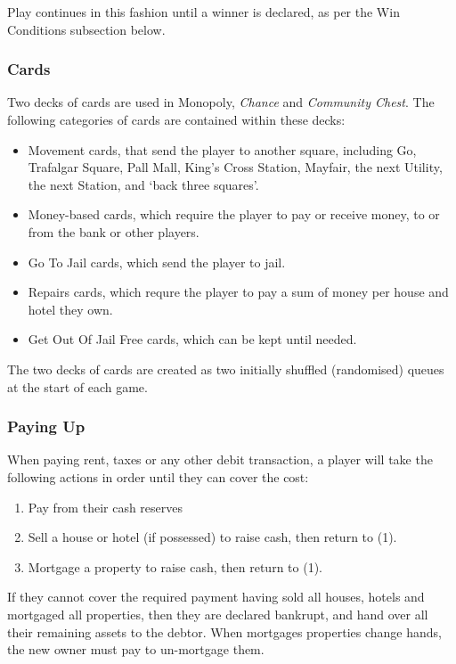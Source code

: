 \documentclass[11pt,a4paper,twocolumn]{scrartcl}
\begin{document}
Play continues in this fashion until a winner is declared, as per the Win Conditions subsection below.

\subsubsection{Cards}

Two decks of cards are used in Monopoly, \textit{Chance} and \textit{Community Chest}. The following categories of cards are contained within these decks:

\begin{itemize}
\item Movement cards, that send the player to another square, including Go, Trafalgar Square, Pall Mall, King's Cross Station, Mayfair, the next Utility, the next Station, and `back three squares'.
\item Money-based cards, which require the player to pay or receive money, to or from the bank or other players.
\item Go To Jail cards, which send the player to jail.
\item Repairs cards, which requre the player to pay a sum of money per house and hotel they own.
\item Get Out Of Jail Free cards, which can be kept until needed.
\end{itemize}

The two decks of cards are created as two initially shuffled (randomised) queues at the start of each game. 

\subsubsection{Paying Up}

When paying rent, taxes or any other debit transaction, a player will take the following actions in order until they can cover the cost:

\begin{enumerate}
\item Pay from their cash reserves
\item Sell a house or hotel (if possessed) to raise cash, then return to (1).
\item Mortgage a property to raise cash, then return to (1).
\end{enumerate}

If they cannot cover the required payment having sold all houses, hotels and mortgaged all properties, then they are declared bankrupt, and hand over all their remaining assets to the debtor. When mortgages properties change hands, the new owner must pay to un-mortgage them.
\end{document}
